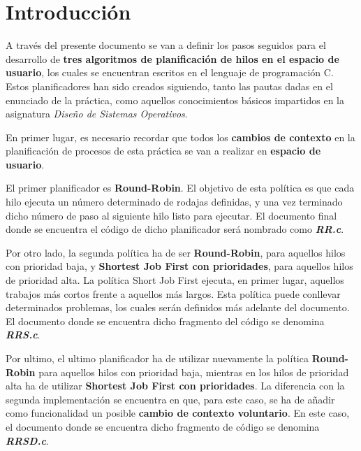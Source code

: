 \documentclass[10pt, spanish, pdftex]{template/UC3M_document}
\author{Lucía Ruz}         %
\begin{document}
\titleMain

\begin{spacing}{0.5}
    \hypersetup{linkcolor=black}    %
    \tableofcontents        %
    \vspace{1cm}
    \listoffigures\newpage          %
\end{spacing}


\section{Introducción}
A través del presente documento se van a definir los pasos seguidos para el desarrollo de \textbf{tres algoritmos de planificación de hilos en el espacio de usuario}, los cuales se encuentran escritos en el lenguaje de programación C. Estos planificadores han sido creados siguiendo, tanto las pautas dadas en el enunciado de la práctica, como aquellos conocimientos básicos impartidos en la asignatura \textit{Diseño de Sistemas Operativos}.

En primer lugar, es necesario recordar que todos los \textbf{cambios de contexto} en la planificación de procesos de esta práctica se van a realizar en \textbf{espacio de usuario}.

El primer planificador es \textbf{Round-Robin}. El objetivo de esta política es que cada hilo ejecuta un número determinado de rodajas definidas, y una vez terminado dicho número de paso al siguiente hilo listo para ejecutar. El documento final donde se encuentra el código de dicho planificador será nombrado como \textbf{\textit{RR.c}}.

Por otro lado, la segunda política ha de ser \textbf{Round-Robin}, para aquellos hilos con prioridad baja, y \textbf{Shortest Job First con prioridades}, para aquellos hilos de prioridad alta. La política Short Job First ejecuta, en primer lugar, aquellos trabajos más cortos frente a aquellos más largos. Esta política puede conllevar determinados problemas, los cuales serán definidos más adelante del documento. El documento donde se encuentra dicho fragmento del código se denomina \textbf{\textit{RRS.c}}.

Por ultimo, el ultimo planificador ha de utilizar nuevamente la política \textbf{Round-Robin} para aquellos hilos con prioridad baja, mientras en los hilos de prioridad alta ha de utilizar \textbf{Shortest Job First con prioridades}. La diferencia con la segunda implementación se encuentra en que, para este caso, se ha de añadir como funcionalidad un posible \textbf{cambio de contexto voluntario}. En este caso, el documento donde se encuentra dicho fragmento de código se denomina \textbf{\textit{RRSD.c}}.
\end{document}
